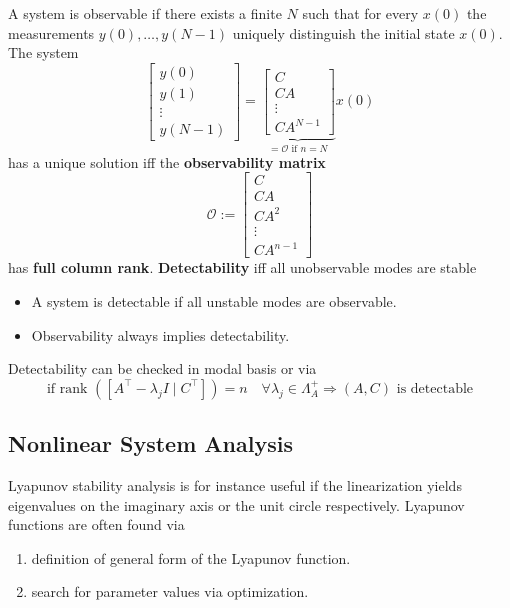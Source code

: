 A system is observable if there exists a finite $N$ such that for every $x(0)$ the measurements $y(0), \ldots, y(N-1)$ uniquely distinguish the initial state $x(0)$.
The system
\noindent\begin{equation*}
    \begin{bmatrix}
        y(0)   \\
        y(1)   \\
        \vdots \\
        y(N-1)
    \end{bmatrix}=
    \underbrace{\begin{bmatrix}
            C      \\
            CA     \\
            \vdots \\
            CA^{N-1}
        \end{bmatrix}}_{=\mathcal{O}\text{ if }n=N}x(0)
\end{equation*}
has a unique solution iff the \textbf{observability matrix}
\begin{equation*}
    \mathcal{O} :=
    \begin{bmatrix}
        C      \\
        CA     \\
        CA^2   \\
        \vdots \\
        CA^{n-1}
    \end{bmatrix}
\end{equation*}
has \textbf{full column rank}.
\newpar{}
\textbf{Detectability} iff all unobservable modes are stable
\begin{itemize}
    \item A system is detectable if all unstable modes are observable.
    \item Observability always implies detectability.
\end{itemize}
Detectability can be checked in modal basis or via
    {\footnotesize
        \noindent\begin{equation*}
            \text{if rank }\left(\left[A^{\top}-\lambda_{j}I\mid C^{\top}\right]\right)=n\quad\forall\lambda_{j}\in\Lambda_{A}^{+}\Rightarrow (A,C) \text{ is detectable}
        \end{equation*}
    }

\subsection{Nonlinear System Analysis}
Lyapunov stability analysis is for instance useful if the linearization yields eigenvalues on the imaginary axis or the unit circle respectively. Lyapunov functions are often found via
\begin{enumerate}
    \item definition of general form of the Lyapunov function.
    \item search for parameter values via optimization.
\end{enumerate}

